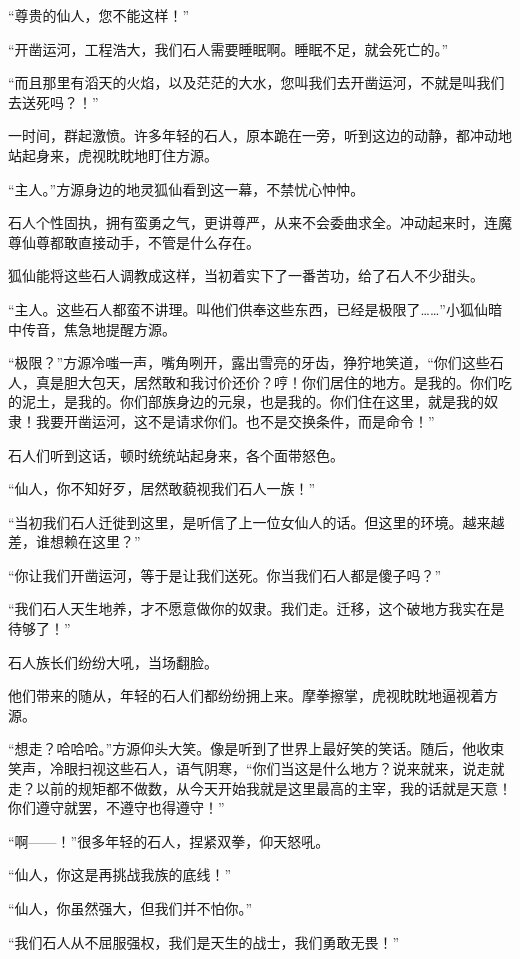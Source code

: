 \begin{this_body}
“尊贵的仙人，您不能这样！”

“开凿运河，工程浩大，我们石人需要睡眠啊。睡眠不足，就会死亡的。”

“而且那里有滔天的火焰，以及茫茫的大水，您叫我们去开凿运河，不就是叫我们去送死吗？！”

一时间，群起激愤。许多年轻的石人，原本跪在一旁，听到这边的动静，都冲动地站起身来，虎视眈眈地盯住方源。

“主人。”方源身边的地灵狐仙看到这一幕，不禁忧心忡忡。

石人个性固执，拥有蛮勇之气，更讲尊严，从来不会委曲求全。冲动起来时，连魔尊仙尊都敢直接动手，不管是什么存在。

狐仙能将这些石人调教成这样，当初着实下了一番苦功，给了石人不少甜头。

“主人。这些石人都蛮不讲理。叫他们供奉这些东西，已经是极限了……”小狐仙暗中传音，焦急地提醒方源。

“极限？”方源冷嗤一声，嘴角咧开，露出雪亮的牙齿，狰狞地笑道，“你们这些石人，真是胆大包天，居然敢和我讨价还价？哼！你们居住的地方。是我的。你们吃的泥土，是我的。你们部族身边的元泉，也是我的。你们住在这里，就是我的奴隶！我要开凿运河，这不是请求你们。也不是交换条件，而是命令！”

石人们听到这话，顿时统统站起身来，各个面带怒色。

“仙人，你不知好歹，居然敢藐视我们石人一族！”

“当初我们石人迁徙到这里，是听信了上一位女仙人的话。但这里的环境。越来越差，谁想赖在这里？”

“你让我们开凿运河，等于是让我们送死。你当我们石人都是傻子吗？”

“我们石人天生地养，才不愿意做你的奴隶。我们走。迁移，这个破地方我实在是待够了！”

石人族长们纷纷大吼，当场翻脸。

他们带来的随从，年轻的石人们都纷纷拥上来。摩拳擦掌，虎视眈眈地逼视着方源。

“想走？哈哈哈。”方源仰头大笑。像是听到了世界上最好笑的笑话。随后，他收束笑声，冷眼扫视这些石人，语气阴寒，“你们当这是什么地方？说来就来，说走就走？以前的规矩都不做数，从今天开始我就是这里最高的主宰，我的话就是天意！你们遵守就罢，不遵守也得遵守！”

“啊——！”很多年轻的石人，捏紧双拳，仰天怒吼。

“仙人，你这是再挑战我族的底线！”

“仙人，你虽然强大，但我们并不怕你。”

“我们石人从不屈服强权，我们是天生的战士，我们勇敢无畏！”


\end{this_body}
